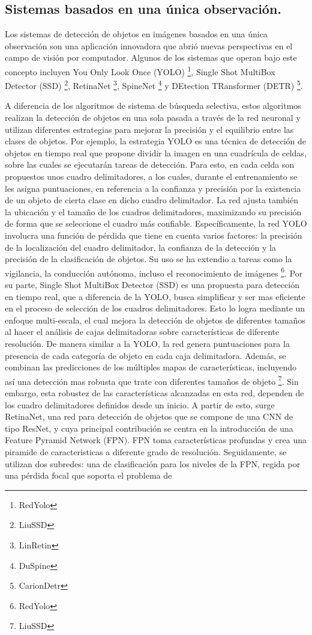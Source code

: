 \subsection{Sistemas basados en una única observación. }Los sistemas de detección de objetos en imágenes basados en una única observación son una aplicación innovadora que abrió nuevas perspectivas en el campo de visión por computador. Algunos de los sistemas que operan bajo este concepto incluyen You Only Look Once (YOLO) \footnote{RedYolo}, Single Shot MultiBox Detector (SSD) \footnote{LiuSSD}, RetinaNet \footnote{LinRetin}, SpineNet \footnote{DuSpine} y DEtection TRansformer (DETR) \footnote{CarionDetr}. \par

A diferencia de los algoritmos de sistema de búsqueda selectiva, estos algoritmos realizan la detección de objetos en una sola pasada a través de la red neuronal y utilizan diferentes estrategias para mejorar la precisión y el equilibrio entre las clases de objetos. Por ejemplo, la estrategia YOLO es una técnica de detección de objetos en tiempo real que propone dividir la imagen en una cuadrícula de celdas, sobre las cuales se ejecutarán tareas de detección. Para esto, en cada celda son propuestos unos cuadro delimitadores, a los cuales, durante el entrenamiento se les asigna puntuaciones, en referencia a la confianza y precisión por la existencia de un objeto de cierta clase en dicho cuadro delimitador. La red ajusta también la ubicación y el tamaño de los cuadros delimitadores, maximizando su precisión de forma que se seleccione el cuadro más confiable. Específicamente, la red YOLO involucra una función de pérdida que tiene en cuenta varios factores: la precisión de la localización del cuadro delimitador, la confianza de la detección y la precisión de la clasificación de objetos. Su uso se ha extendio a tareas como la vigilancia, la conducción autónoma, incluso el reconocimiento de imágenes \footnote{RedYolo}. Por su parte, Single Shot MultiBox Detector (SSD) es una propuesta para detección en tiempo real, que a diferencia de la YOLO, busca simplificar y ser mas eficiente en el proceso de selección de los cuadros delimitadores. Esto lo logra mediante un enfoque multi-escala, el cual mejora la detección de objetos de diferentes tamaños al hacer el análisis de cajas delimitadoras sobre características de diferente resolución. De manera similar a la YOLO, la red genera puntuaciones para la presencia de cada categoría de objeto en cada caja delimitadora. Además, se combinan las predicciones de los múltiples mapas de características, incluyendo así una detección mas robusta que trate con diferentes tamaños de objeto \footnote{LiuSSD}. Sin embargo, esta robustez de las características alcanzadas en esta red, dependen de los cuadro delimitadores definidos desde un inicio. A partir de esto, surge RetinaNet, una red para detección de objetos que se compone de una CNN  de tipo ResNet, y cuya principal contribución se centra en la introducción de una Feature Pyramid Network (FPN). FPN toma características profundas y crea una piramide de caracteristicas a diferente grado de resolución. Seguidamente, se utilizan dos subredes: una de clasificación para los niveles de la FPN, regida por una pérdida focal que soporta el problema de 